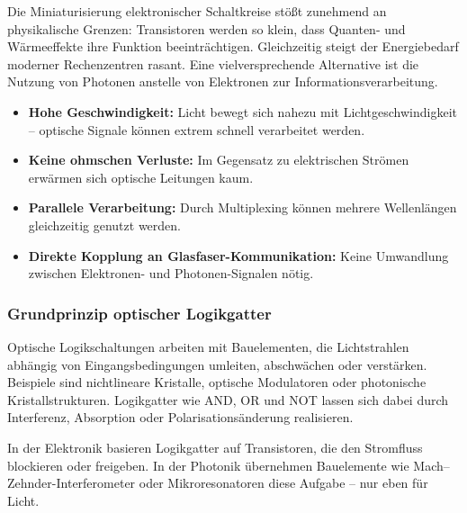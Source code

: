 Die Miniaturisierung elektronischer Schaltkreise stößt zunehmend an physikalische Grenzen: Transistoren werden so klein, dass Quanten- und Wärmeeffekte ihre Funktion beeinträchtigen. Gleichzeitig steigt der Energiebedarf moderner Rechenzentren rasant. Eine vielversprechende Alternative ist die Nutzung von Photonen anstelle von Elektronen zur Informationsverarbeitung.
\vspace{1em}
\begin{tcolorbox}[physikbox, title=Warum Photonen für Logikschaltungen interessant sind, label=box:optlogik_vorteile]
	\small
	\begin{itemize}
		\item \textbf{Hohe Geschwindigkeit:} Licht bewegt sich nahezu mit Lichtgeschwindigkeit – optische Signale können extrem schnell verarbeitet werden.
		\item \textbf{Keine ohmschen Verluste:} Im Gegensatz zu elektrischen Strömen erwärmen sich optische Leitungen kaum.
		\item \textbf{Parallele Verarbeitung:} Durch Multiplexing können mehrere Wellenlängen gleichzeitig genutzt werden.
		\item \textbf{Direkte Kopplung an Glasfaser-Kommunikation:} Keine Umwandlung zwischen Elektronen- und Photonen-Signalen nötig.
	\end{itemize}
\end{tcolorbox}

\subsubsection{Grundprinzip optischer Logikgatter}

Optische Logikschaltungen arbeiten mit Bauelementen, die Lichtstrahlen abhängig von Eingangsbedingungen umleiten, abschwächen oder verstärken. Beispiele sind nichtlineare Kristalle, optische Modulatoren oder photonische Kristallstrukturen.  
Logikgatter wie \textsc{AND}, \textsc{OR} und \textsc{NOT} lassen sich dabei durch Interferenz, Absorption oder Polarisationsänderung realisieren.
\vspace{1em}
\begin{tcolorbox}[didaktikbox, title=Von Elektronik zu Photonik]
	\label{box:optlogik_didaktik}
	\small
	In der Elektronik basieren Logikgatter auf Transistoren, die den Stromfluss blockieren oder freigeben. In der Photonik übernehmen Bauelemente wie Mach–Zehnder-Interferometer oder Mikroresonatoren diese Aufgabe – nur eben für Licht.
\end{tcolorbox}

